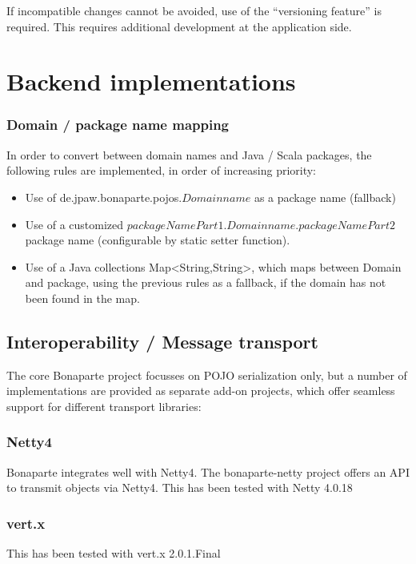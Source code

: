 \documentclass[11pt,a4paper,oneside]{article}
\begin{document}
If incompatible changes cannot be avoided, use of the ``versioning feature'' is required. This requires additional development
at the application side.







\section{Backend implementations}

\subsubsection{Domain / package name mapping}
In order to convert between domain names and Java / Scala packages, the following rules are implemented, in order of increasing
priority:
\begin{itemize}
    \item Use of {\ttfamily de.jpaw.bonaparte.pojos.}$Domainname$ as a package name (fallback)
    \item Use of a customized $packageNamePart1$.$Domainname$.$packageNamePart2$ package name (configurable by static setter
    function).
    \item Use of a Java collections {\ttfamily Map<String,String>}, which maps between Domain and package, using the previous rules as a
    fallback, if the domain has not been found in the map.
\end{itemize}


\subsection{Interoperability / Message transport}
The core Bonaparte project focusses on POJO serialization only, but a number of implementations are provided as separate add-on projects, which offer seamless support for different transport libraries:

\subsubsection{Netty4}
Bonaparte integrates well with Netty4.
The bonaparte-netty project offers an API to transmit objects via Netty4.
This has been tested with Netty 4.0.18

\subsubsection{vert.x}
This has been tested with vert.x 2.0.1.Final
\end{document}

